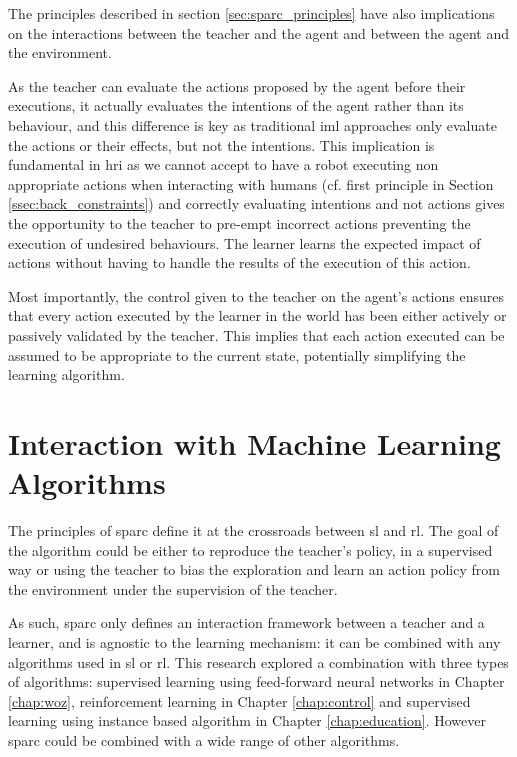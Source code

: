 The principles described in section \ref{sec:sparc_principles} have also implications on the interactions between the teacher and the agent and between the agent and the environment.

As the teacher can evaluate the actions proposed by the agent before their executions, it actually evaluates the intentions of the agent rather than its behaviour, and this difference is key as traditional \gls{iml} approaches only evaluate the actions or their effects, but not the intentions. This implication is fundamental in \gls{hri} as we cannot accept to have a robot executing non appropriate actions when interacting with humans (cf. first principle in Section \ref{ssec:back_constraints}) and correctly evaluating intentions and not actions gives the opportunity to the teacher to pre-empt incorrect actions preventing the execution of undesired behaviours. The  learner learns the expected impact of actions without having to handle the results of the execution of this action.

Most importantly, the control given to the teacher on the agent's actions ensures that every action executed by the learner in the world has been either actively or passively validated by the teacher. This implies that each action executed can be assumed to be appropriate to the current state, potentially simplifying the learning algorithm.

\section{Interaction with Machine Learning Algorithms}

The principles of \gls{sparc} define it at the crossroads between \acrlong{sl} and \acrlong{rl}. The  goal of the algorithm could be either to reproduce the teacher's policy, in a supervised way or using the teacher to bias the exploration and learn an action policy from the environment under the supervision of the teacher.

As such, \gls{sparc} only defines an interaction framework between a teacher and a learner, and is agnostic to the learning mechanism: it can be combined with any algorithms used in \acrlong{sl} or \acrlong{rl}. This research explored a combination with three types of algorithms: supervised learning using feed-forward neural networks in Chapter \ref{chap:woz}, reinforcement learning in Chapter \ref{chap:control} and supervised learning using instance based algorithm in Chapter \ref{chap:education}. However \gls{sparc} could be combined with a wide range of other algorithms.


